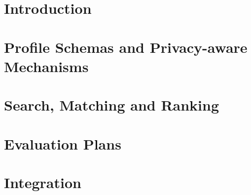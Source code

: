 \documentclass{SmartReport}
\newcommand{\todo}[1]{\noindent{\textcolor{red}{[TODO: #1]}}}
\begin{document}
\newpage


\section{Introduction}
\label{sec:intro}


\newpage


\section{Profile Schemas and Privacy-aware Mechanisms}
\label{sec:profiling}


\section{Search, Matching and Ranking}
\label{sec:matching_ranking}


% 

\section{Evaluation Plans}
\label{sec:evaluation}


\section{Integration}
\label{sec:integration}

\end{document}
